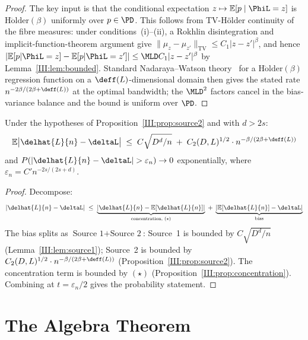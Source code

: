 \begin{proof}
The key input is that the conditional expectation $z \mapsto \mathbb{E}[p \mid \PhiL = z]$
is $\mathrm{H\ddot{o}lder}(\beta)$ uniformly over $p \in \PD$.
This follows from TV-Hölder continuity of the fibre measures:
under conditions~(i)--(ii), a Rokhlin disintegration and implicit-function-theorem
argument give $\|\mu_z - \mu_{z'}\|_{\mathrm{TV}} \leq C_1|z-z'|^\beta$,
and hence $|\mathbb{E}[p|\PhiL=z] - \mathbb{E}[p|\PhiL=z']| \leq \MLD C_1|z-z'|^\beta$
by Lemma~\ref{III:lem:bounded}.
Standard Nadaraya--Watson theory~\cite{Gyorfi2002} for a $\mathrm{H\ddot{o}lder}(\beta)$
regression function on a $\deff(L)$-dimensional domain then gives the stated rate
$n^{-2\beta/(2\beta+\deff(L))}$ at the optimal bandwidth; the $\MLD^2$ factors
cancel in the bias-variance balance and the bound is uniform over $\PD$.
\end{proof}
\fi

\begin{theorem}
\label{III:thm:convergence}
Under the hypotheses of Proposition~\ref{III:prop:source2} and with $d > 2s$:
\[
  \mathbb{E}\bigl|\delhat{L}{n} - \deltaL\bigr|
  \;\leq\;
  C\sqrt{D^d/n}
  \;+\; C_2(D,L)^{1/2} \cdot n^{-\beta/(2\beta+\deff(L))}
\]
and $P(|\delhat{L}{n} - \deltaL| > \varepsilon_n) \to 0$ exponentially,
where $\varepsilon_n = C' n^{-2s/(2s+d)}$.
\end{theorem}

\begin{proof}
Decompose:
\[
  |\delhat{L}{n} - \deltaL|
  \;\leq\;
  \underbrace{|\delhat{L}{n} - \mathbb{E}[\delhat{L}{n}]|}_{\text{concentration, }(\star)}
  \;+\;
  \underbrace{|\mathbb{E}[\delhat{L}{n}] - \deltaL|}_{\text{bias}}
\]
The bias splits as $\text{Source~1} + \text{Source~2}$:
Source~1 is bounded by $C\sqrt{D^d/n}$ (Lemma~\ref{III:lem:source1});
Source~2 is bounded by $C_2(D,L)^{1/2} \cdot n^{-\beta/(2\beta+\deff(L))}$
(Proposition~\ref{III:prop:source2}).
The concentration term is bounded by $(\star)$ (Proposition~\ref{III:prop:concentration}).
Combining at $t = \varepsilon_n/2$ gives the probability statement.
\end{proof}

\section{The Algebra Theorem}
\label{III:sec:algebra}

